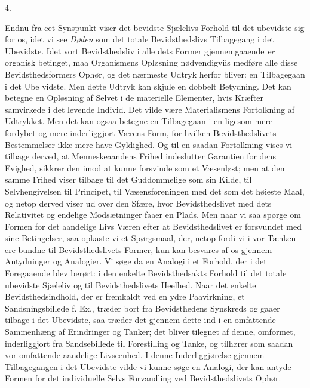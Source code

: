 \documentclass[12pt,a4paper,openany]{book}
\newcommand{\secnum}[1]{\par\begin{center}#1\end{center}\par\nobreak}
\newcommand{\opage}[1]{\marginnote{\footnotesize\textit{[#1]}}}
\begin{document}
\secnum{4.}

Endnu fra eet Synspunkt viser det bevidste Sjælelivs
Forhold til det ubevidste sig for os, idet vi see \emph{Døden} som
det totale Bevidsthedslivs Tilbagegang i det Ubevidste. Idet
vort Bevidsthedsliv i alle dets Former gjennemgaaende \emph{er}
organisk betinget, maa Organismens Opløsning nødvendigviis
medføre alle disse Bevidsthedsformers Ophør, og det
nærmeste Udtryk herfor bliver: en Tilbagegaan i det Ube%
\opage{56}vidste. Men dette Udtryk kan skjule en dobbelt Betydning.
Det kan betegne en Opløsning af Selvet i de materielle
Elementer, hvis Kræfter samvirkede i det levende Individ.
Det vilde være Materialismens Fortolkning af Udtrykket.
Men det kan ogsaa betegne en Tilbagegaan i en ligesom
mere fordybet og mere inderliggjort Værens Form, for hvilken
Bevidsthedslivets Bestemmelser ikke mere have Gyldighed. Og
til en saadan Fortolkning vises vi tilbage derved, at Menneskeaandens
Frihed indeslutter Garantien for dens Evighed,
sikkrer den imod at kunne forsvinde som et Væsenløst; men
at den samme Frihed viser tilbage til det Guddommelige
som sin Kilde, til Selvhengivelsen til Principet, til Væsensforeningen
med det som det høieste Maal, og netop derved
viser ud over den Sfære, hvor Bevidsthedslivet med dets
Relativitet og endelige Modsætninger faaer en Plads. Men
naar vi saa spørge om Formen for det aandelige Livs Væren
efter at Bevidsthedslivet er forsvundet med sine Betingelser, saa
opkaste vi et Spørgsmaal, der, netop fordi vi i vor Tænken
ere bundne til Bevidsthedslivets Former, kun kan besvares
af os gjennem Antydninger og Analogier. Vi søge da en
Analogi i et Forhold, der i det Foregaaende blev berørt: i
den enkelte Bevidsthedsakts Forhold til det totale ubevidste
Sjæleliv og til Bevidsthedslivets Heelhed. Naar det enkelte
Bevidsthedsindhold, der er fremkaldt ved en ydre Paavirkning,
et Sandsningsbillede f. Ex., træder bort fra Bevidsthedens
Synskreds og gaaer tilbage i det Ubevidste, saa træder det
gjennem dette ind i en omfattende Sammenhæng af Erindringer
og Tanker; det bliver tilegnet af denne, omformet, inderliggjort
fra Sandsebillede til Forestilling og Tanke, og tilhører
som saadan vor omfattende aandelige Livseenhed. I denne
Inderliggjørelse gjennem Tilbagegangen i det Ubevidste vilde
vi kunne søge en Analogi, der kan antyde Formen for det
individuelle Selvs Forvandling ved Bevidsthedslivets Ophør.
\end{document}
